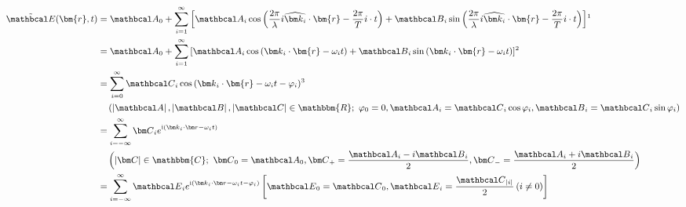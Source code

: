 \begin{corollary}
	\begin{equation}\small
		\begin{split}
			\tilde {{\mathbcal E}}(\bm{r},t) &= {{\mathbcal A}_0} + \sum\limits_{i = 1}^\infty  {\left[ {{{\mathbcal A}_i}\cos \left( {\frac{{2\pi }}{\lambda }i\widehat {{{\bm k}_i}} \cdot \bm{r} - \frac{{2\pi }}{T}i \cdot t} \right) + {{\mathbcal B}_i}\sin \left( {\frac{{2\pi }}{\lambda }i\widehat {{{\bm k}_i}} \cdot \bm{r} - \frac{{2\pi }}{T}i \cdot t} \right)} \right]} \footnotemark \\
			&= {{\mathbcal A}_0} + \sum\limits_{i = 1}^\infty  {\left[ {{{\mathbcal A}_i}\cos \left( {{{\bm k}_i} \cdot \bm{r} - {\omega _i}t} \right) + {{\mathbcal B}_i}\sin \left( {{{\bm k}_i} \cdot \bm{r} - {\omega _i}t} \right)} \right]} \footnotemark \\
			&= \sum\limits_{i = 0}^\infty  {{{{\mathbcal C}_i}\cos \left( {{{\bm k}_i} \cdot \bm{r} - {\omega _i}t} - \varphi_i \right)}} \footnotemark \\
			&\hphantom{iii} \left( {\left| {\mathbcal A} \right|,\left| {\mathbcal B} \right|,\left| {\mathbcal C} \right| \in \mathbbm{R}};\ \varphi_0 = 0 , {{\mathbcal A}_i} = {{\mathbcal C}_i}\cos \varphi_i, {{\mathbcal B}_i} = {{\mathbcal C}_i}\sin \varphi_i \right) \\
			&= \sum\limits_{i =  - \infty }^\infty  {{{\bm C}_i}{e^{{\mathrm i}({{\bm k}_i} \cdot {\bm r} - {\omega _i}t)}}} \\
			&\hphantom{iii} \left( {\left| {\bm C} \right| \in \mathbbm{C};\ {{\bm C}_0} = {{\mathbcal A}_0},{{\bm C}_ + } = \frac{{{{\mathbcal A}_i} - i{{\mathbcal B}_i}}}{2},{{\bm C}_ - } = \frac{{{{\mathbcal A}_i} + i{{\mathbcal B}_i}}}{2}} \right) \\
			&= \sum\limits_{i =  - \infty }^\infty  {{{\mathbcal E}_i}{e^{{\mathrm i}({{\bm k}_i} \cdot {\bm r} - {\omega _i}t - \varphi_i)}}} \left[ {\mathbcal E}_0 = {\mathbcal C}_0 , {\mathbcal E}_i = \frac{{\mathbcal C}_{\left| i \right|}}{2} \left( i \neq 0 \right) \right] \\ %
		\end{split}
	\end{equation}
\end{corollary}
